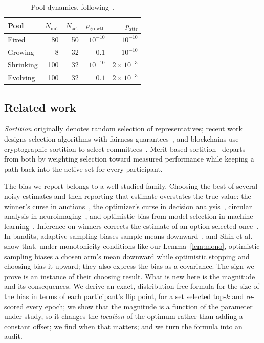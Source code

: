 \documentclass[sigconf,anonymous,review,nonacm]{acmart}
\begin{document}
\begin{table}[t]\centering\small
\caption{Pool dynamics, following~\cite{kruijssen2024}.}
\label{tab:scenarios}
\begin{tabular}{lrrrr}
\toprule
Pool & $N_{\mathrm{init}}$ & $N_{\mathrm{act}}$ & $p_{\mathrm{growth}}$ & $p_{\mathrm{attr}}$\\
\midrule
Fixed     & 80  & 50 & $10^{-10}$ & $10^{-10}$\\
Growing   & 8   & 32 & $0.1$      & $10^{-10}$\\
Shrinking & 100 & 32 & $10^{-10}$ & $2\times10^{-3}$\\
Evolving  & 100 & 32 & $0.1$      & $2\times10^{-3}$\\
\bottomrule
\end{tabular}
\end{table}

\subsection{Related work}
\emph{Sortition} originally denotes random selection of representatives; recent work
designs selection algorithms with fairness guarantees~\cite{flanigan2021fair}, and
blockchains use cryptographic sortition to select committees~\cite{gilad2017algorand}.
Merit-based sortition~\cite{kruijssen2024} departs from both by weighting selection
toward measured performance while keeping a path back into the active set for every
participant.

The bias we report belongs to a well-studied family. Choosing the best of several noisy
estimates and then reporting that estimate overstates the true value: the winner's curse
in auctions~\cite{thaler1988winner}, the optimizer's curse in decision
analysis~\cite{smith2006optimizer}, circular analysis in
neuroimaging~\cite{kriegeskorte2009circular}, and optimistic bias from model selection in
machine learning~\cite{cawley2010overfitting}. Inference on winners corrects the estimate
of an option selected once~\cite{andrews2024winners}. In bandits, adaptive sampling biases
sample means downward~\cite{nie2018adaptive}, and Shin et al.~\cite{shin2019bias} show
that, under monotonicity conditions like our Lemma~\ref{lem:mono}, optimistic sampling
biases a chosen arm's mean downward while optimistic stopping and choosing bias it upward;
they also express the bias as a covariance. The sign we prove is an instance of their
choosing result. What is new here is the magnitude and its consequences. We derive an exact,
distribution-free formula for the size of the bias in terms of each participant's flip
point, for a set selected top-$k$ and re-scored every epoch; we show that the magnitude is a
function of the parameter under study, so it changes the \emph{location} of the optimum
rather than adding a constant offset; we find when that matters; and we turn the formula
into an audit.
\end{document}

